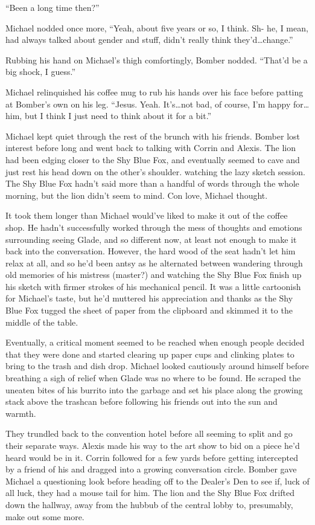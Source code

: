 ``Been a long time then?''

Michael nodded once more, ``Yeah, about five years or so, I think.  Sh- he, I mean, had always talked about gender and stuff, didn't really think they'd\ldots{}change.''

Rubbing his hand on Michael's thigh comfortingly, Bomber nodded.  ``That'd be a big shock, I guess.''

Michael relinquished his coffee mug to rub his hands over his face before patting at Bomber's own on his leg.  ``Jesus.  Yeah.  It's\ldots{}not bad, of course, I'm happy for\ldots{}him, but I think I just need to think about it for a bit.''

Michael kept quiet through the rest of the brunch with his friends.  Bomber lost interest before long and went back to talking with Corrin and Alexis.  The lion had been edging closer to the Shy Blue Fox, and eventually seemed to cave and just rest his head down on the other's shoulder. watching the lazy sketch session.  The Shy Blue Fox hadn't said more than a handful of words through the whole morning, but the lion didn't seem to mind.  Con love, Michael thought.

It took them longer than Michael would've liked to make it out of the coffee shop.  He hadn't successfully worked through the mess of thoughts and emotions surrounding seeing Glade, and so different now, at least not enough to make it back into the conversation.  However, the hard wood of the seat hadn't let him relax at all, and so he'd been antsy as he alternated between wandering through old memories of his mistress (master?) and watching the Shy Blue Fox finish up his sketch with firmer strokes of his mechanical pencil.  It was a little cartoonish for Michael's taste, but he'd muttered his appreciation and thanks as the Shy Blue Fox tugged the sheet of paper from the clipboard and skimmed it to the middle of the table.

Eventually, a critical moment seemed to be reached when enough people decided that they were done and started clearing up paper cups and clinking plates to bring to the trash and dish drop.  Michael looked cautiously around himself before breathing a sigh of relief when Glade was no where to be found.  He scraped the uneaten bites of his burrito into the garbage and set his place along the growing stack above the trashcan before following his friends out into the sun and warmth.

They trundled back to the convention hotel before all seeming to split and go their separate ways. Alexis made his way to the art show to bid on a piece he'd heard would be in it.  Corrin followed for a few yards before getting intercepted by a friend of his and dragged into a growing conversation circle.  Bomber gave Michael a questioning look before heading off to the Dealer's Den to see if, luck of all luck, they had a mouse tail for him.  The lion and the Shy Blue Fox drifted down the hallway, away from the hubbub of the central lobby to, presumably, make out some more.

